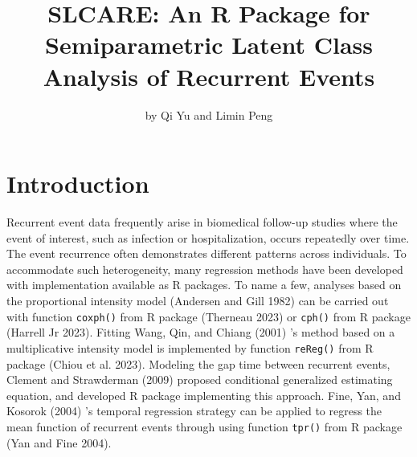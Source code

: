 \title{SLCARE: An R Package for Semiparametric Latent Class Analysis of Recurrent Events}


\author{by Qi Yu and Limin Peng}

\maketitle


\hypertarget{introduction}{%
\section{Introduction}\label{introduction}}

Recurrent event data frequently arise in biomedical follow-up studies where the event of interest, such as infection or hospitalization, occurs repeatedly over time. The event recurrence often demonstrates different patterns across individuals. To accommodate such heterogeneity, many regression methods have been developed with implementation available as R packages. To name a few, analyses based on the proportional intensity model (Andersen and Gill 1982) can be carried out with function \texttt{coxph()} from R package  (Therneau 2023) or \texttt{cph()} from R package  (Harrell Jr 2023).
Fitting Wang, Qin, and Chiang (2001) 's method based on a multiplicative intensity model is implemented by function \texttt{reReg()} from R package  (Chiou et al. 2023). Modeling the gap time between recurrent events, Clement and Strawderman (2009) proposed conditional generalized estimating equation, and developed R package  implementing this approach.
Fine, Yan, and Kosorok (2004) 's temporal regression strategy can be applied to regress the mean function of recurrent events through using function \texttt{tpr()} from R package  (Yan and Fine 2004).

